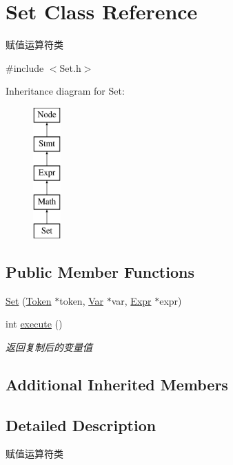 \hypertarget{class_set}{}\section{Set Class Reference}
\label{class_set}


赋值运算符类  




{\ttfamily \#include $<$Set.\+h$>$}

Inheritance diagram for Set\+:\begin{figure}[H]
\begin{center}
\leavevmode
\includegraphics[height=5.000000cm]{class_set}
\end{center}
\end{figure}
\subsection*{Public Member Functions}
\begin{DoxyCompactItemize}
\item 
\hyperlink{class_set_a05474c6de277894bcebe5230c587efab}{Set} (\hyperlink{class_token}{Token} $\ast$token, \hyperlink{class_var}{Var} $\ast$var, \hyperlink{class_expr}{Expr} $\ast$expr)
\item 
int \hyperlink{class_set_a7776ba36f3af8b09772b36927beb5f5c}{execute} ()
\begin{DoxyCompactList}\small\item\em 返回复制后的变量值 \end{DoxyCompactList}\end{DoxyCompactItemize}
\subsection*{Additional Inherited Members}


\subsection{Detailed Description}
赋值运算符类 


